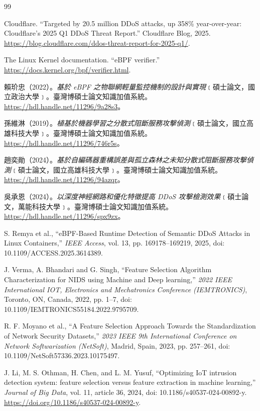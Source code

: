 \documentclass[12pt, a4paper, fontset=none]{ctexart}
\begin{document}
\newpage
\begin{thebibliography}{99}

Cloudflare. ``Targeted by 20.5 million DDoS attacks, up 358\% year-over-year: Cloudflare's 2025 Q1 DDoS Threat Report.'' Cloudflare Blog, 2025. \url{https://blog.cloudflare.com/ddos-threat-report-for-2025-q1/}.

The Linux Kernel documentation. ``eBPF verifier.'' \url{https://docs.kernel.org/bpf/verifier.html}.

賴玠忠（2022）。\textit{基於 eBPF 之物聯網輕量監控機制的設計與實現}﹝碩士論文，國立政治大學﹞。臺灣博碩士論文知識加值系統。\url{https://hdl.handle.net/11296/9a28s3}。

孫維淋（2019）。\textit{植基於機器學習之分散式阻斷服務攻擊偵測}﹝碩士論文，國立高雄科技大學﹞。臺灣博碩士論文知識加值系統。\url{https://hdl.handle.net/11296/746r5s}。

趙奕勛（2024）。\textit{基於自編碼器重構誤差與孤立森林之未知分散式阻斷服務攻擊偵測}﹝碩士論文，國立高雄科技大學﹞。臺灣博碩士論文知識加值系統。\url{https://hdl.handle.net/11296/94azqr}。

吳承恩（2024）。\textit{以深度神經網路和優化特徵提高 DDoS 攻擊檢測效果}﹝碩士論文，萬能科技大學﹞。臺灣博碩士論文知識加值系統。\url{https://hdl.handle.net/11296/spx9zx}。

S. Remya et al., ``eBPF-Based Runtime Detection of Semantic DDoS Attacks in Linux Containers,'' \textit{IEEE Access}, vol. 13, pp. 169178--169219, 2025, doi: 10.1109/ACCESS.2025.3614389.

J. Verma, A. Bhandari and G. Singh, ``Feature Selection Algorithm Characterization for NIDS using Machine and Deep learning,'' \textit{2022 IEEE International IOT, Electronics and Mechatronics Conference (IEMTRONICS)}, Toronto, ON, Canada, 2022, pp. 1--7, doi: 10.1109/IEMTRONICS55184.2022.9795709.

R. F. Moyano et al., ``A Feature Selection Approach Towards the Standardization of Network Security Datasets,'' \textit{2023 IEEE 9th International Conference on Network Softwarization (NetSoft)}, Madrid, Spain, 2023, pp. 257--261, doi: 10.1109/NetSoft57336.2023.10175497.

J. Li, M. S. Othman, H. Chen, and L. M. Yusuf, ``Optimizing IoT intrusion detection system: feature selection versus feature extraction in machine learning,'' \textit{Journal of Big Data}, vol. 11, article 36, 2024, doi: 10.1186/s40537-024-00892-y. \url{https://doi.org/10.1186/s40537-024-00892-y}.


\end{thebibliography}
\end{document}
